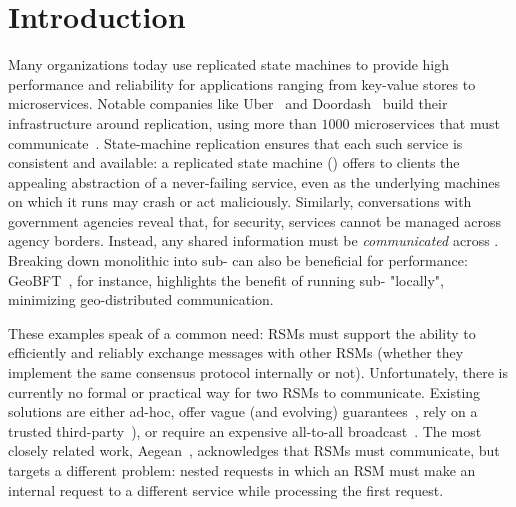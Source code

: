 \section{Introduction}
\label{s:intro}

Many organizations today use replicated state machines to provide high performance and reliability for applications ranging from key-value stores to microservices. Notable companies like Uber~\cite{uber-engg-microservice,uber-micro-macro} and Doordash~\cite{doordash-microservice-failure} build their infrastructure around replication, using more than $1000$ microservices that must communicate~\cite{aegean}. State-machine replication ensures that each such service is consistent and available: a replicated state machine (\RSM{}) offers to clients the appealing abstraction of a never-failing service, even as the underlying machines on which it runs may crash or act maliciously. Similarly, conversations with government agencies reveal that, for security, services cannot be managed across agency borders. 
Instead, any shared information must be \textit{communicated} across .  
Breaking down monolithic  into sub- can also be beneficial for performance:  GeoBFT~\cite{geobft,blockchain-book}, for instance, 
highlights the benefit of running sub- "locally", minimizing geo-distributed communication. 


These examples speak of a common need: RSMs must support the ability to efficiently and reliably exchange messages with other RSMs (whether they implement the same consensus protocol internally or not). Unfortunately, there is currently no formal or practical way for two RSMs to communicate. 
Existing solutions are either ad-hoc, offer vague (and evolving) guarantees~\cite{blockchain-interop-survey}, 
rely on a trusted third-party~\cite{trustboost}), or 
require an expensive all-to-all broadcast~\cite{spanner,sharper}. The most closely related work, Aegean~\cite{aegean}, acknowledges that RSMs must communicate, but targets a different problem: nested requests in which an RSM must make an internal request to a different service while processing the first request. 

